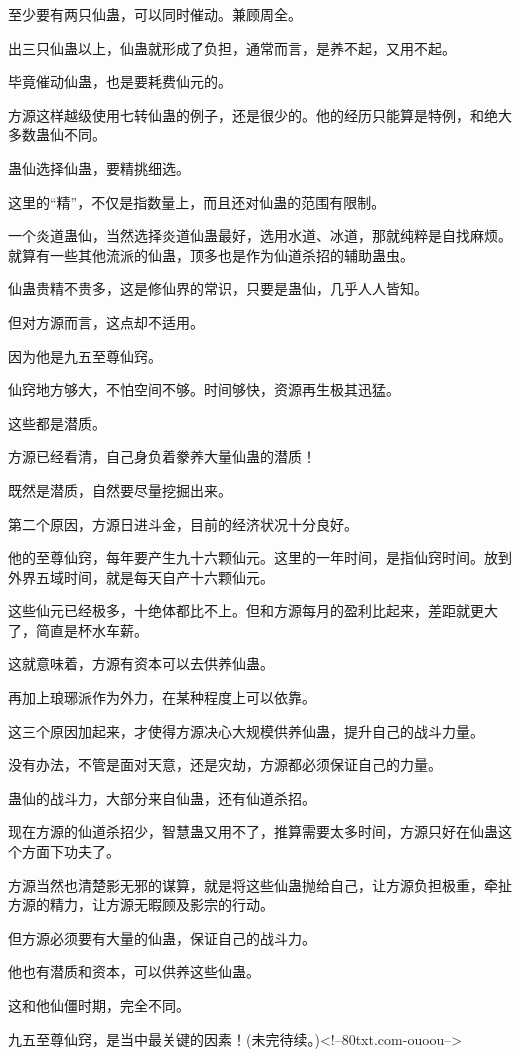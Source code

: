 \begin{this_body}
至少要有两只仙蛊，可以同时催动。兼顾周全。

出三只仙蛊以上，仙蛊就形成了负担，通常而言，是养不起，又用不起。

毕竟催动仙蛊，也是要耗费仙元的。

方源这样越级使用七转仙蛊的例子，还是很少的。他的经历只能算是特例，和绝大多数蛊仙不同。

蛊仙选择仙蛊，要精挑细选。

这里的“精”，不仅是指数量上，而且还对仙蛊的范围有限制。

一个炎道蛊仙，当然选择炎道仙蛊最好，选用水道、冰道，那就纯粹是自找麻烦。就算有一些其他流派的仙蛊，顶多也是作为仙道杀招的辅助蛊虫。

仙蛊贵精不贵多，这是修仙界的常识，只要是蛊仙，几乎人人皆知。

但对方源而言，这点却不适用。

因为他是九五至尊仙窍。

仙窍地方够大，不怕空间不够。时间够快，资源再生极其迅猛。

这些都是潜质。

方源已经看清，自己身负着豢养大量仙蛊的潜质！

既然是潜质，自然要尽量挖掘出来。

第二个原因，方源日进斗金，目前的经济状况十分良好。

他的至尊仙窍，每年要产生九十六颗仙元。这里的一年时间，是指仙窍时间。放到外界五域时间，就是每天自产十六颗仙元。

这些仙元已经极多，十绝体都比不上。但和方源每月的盈利比起来，差距就更大了，简直是杯水车薪。

这就意味着，方源有资本可以去供养仙蛊。

再加上琅琊派作为外力，在某种程度上可以依靠。

这三个原因加起来，才使得方源决心大规模供养仙蛊，提升自己的战斗力量。

没有办法，不管是面对天意，还是灾劫，方源都必须保证自己的力量。

蛊仙的战斗力，大部分来自仙蛊，还有仙道杀招。

现在方源的仙道杀招少，智慧蛊又用不了，推算需要太多时间，方源只好在仙蛊这个方面下功夫了。

方源当然也清楚影无邪的谋算，就是将这些仙蛊抛给自己，让方源负担极重，牵扯方源的精力，让方源无暇顾及影宗的行动。

但方源必须要有大量的仙蛊，保证自己的战斗力。

他也有潜质和资本，可以供养这些仙蛊。

这和他仙僵时期，完全不同。

九五至尊仙窍，是当中最关键的因素！(未完待续。)<!--80txt.com-ouoou-->

\end{this_body}

